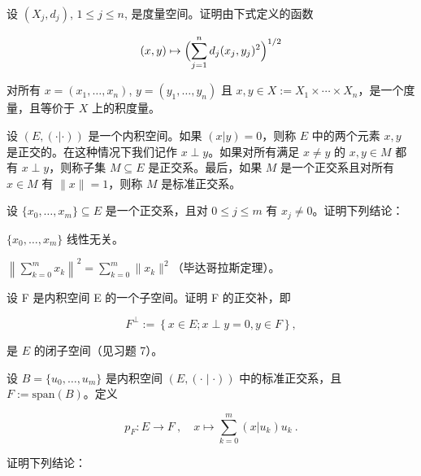 \begin{exercises}
\item[9.]

设 $ (X_j, d_j) $,  $ 1 \leq j \leq n $, 是度量空间。证明由下式定义的函数

\[
(x,y)\mapsto\Bigl(\sum_{j=1}^{n}d_{j}(x_{j},y_{j})^{2}\Bigr)^{1/2}
\]

对所有 $ x = (x_1, \ldots, x_n) $,  $ y = (y_1, \ldots, y_n) $ 且 $ x, y \in X := X_1 \times \cdots \times X_n $，是一个度量，且等价于 $ X $ 上的积度量。

\item[10.]

设 $ (E, (\cdot|\cdot)) $ 是一个内积空间。如果 $ (x|y) = 0 $，则称 $ E $ 中的两个元素 $ x, y $ 是正交的。在这种情况下我们记作 $ x \perp y $。如果对所有满足 $ x \neq y $ 的 $ x, y \in M $ 都有 $ x \perp y $，则称子集 $ M \subseteq E $ 是正交系。最后，如果 $ M $ 是一个正交系且对所有 $ x \in M $ 有 $ \|x\| = 1 $，则称 $ M $ 是标准正交系。

设 $\{x_0, \ldots, x_m\} \subseteq E$ 是一个正交系，且对 $0 \leq j \leq m$ 有 $x_j \neq 0$。证明下列结论：

\begin{items}
\item

$ \{x_{0}, \ldots, x_{m}\} $ 线性无关。

\item

$ \left\|\sum_{k=0}^{m} x_k\right\|^2 = \sum_{k=0}^{m} \|x_k\|^2 $（毕达哥拉斯定理）。

\end{items}

\item[11.]

设 F 是内积空间 E 的一个子空间。证明 F 的正交补，即

\[
F^{\perp}:=\left\{x\in E;x\perp y=0,y\in F\right\},
\]

是 $E$ 的闭子空间（见习题 7）。

\item[12.]

设 $ B = \{u_0, \ldots, u_m\} $ 是内积空间 $ (E, (\cdot \mid \cdot)) $ 中的标准正交系，且 $ F := \text{span}(B) $。定义

\[
p_{F}\colon E\to F~,\quad x\mapsto\sum_{k=0}^{m}(x|u_{k})u_{k}~.
\]

证明下列结论：

\begin{items}
\item


\end{items}
\end{exercises}

